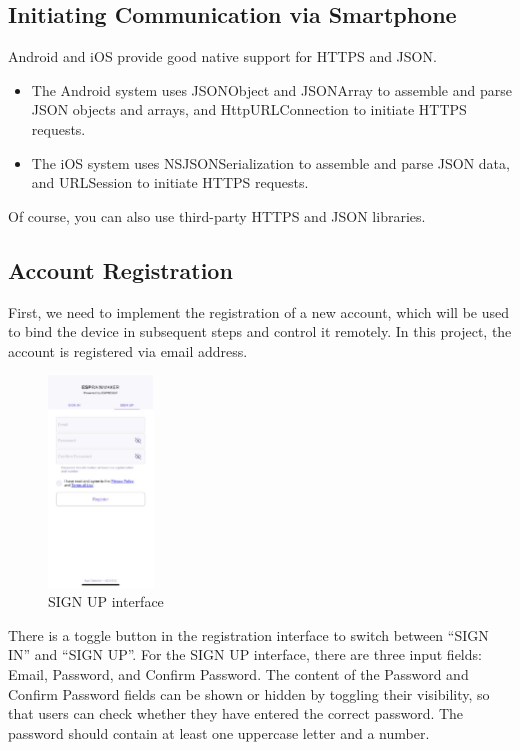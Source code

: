 \documentclass[a4paper,12pt,openany]{book}
\begin{document}
\subsection{Initiating Communication via Smartphone}
Android and iOS provide good native support for HTTPS and JSON.

\begin{itemize}
    \item The Android system uses JSONObject and JSONArray to assemble and parse JSON objects and arrays, and HttpURLConnection to initiate HTTPS requests.
    \item The iOS system uses NSJSONSerialization to assemble and parse JSON data, and URLSession to initiate HTTPS requests.
\end{itemize}

Of course, you can also use third-party HTTPS and JSON libraries.

\subsection{Account Registration}
First, we need to implement the registration of a new account, which will be used to bind the device in subsequent steps and control it remotely. In this project, the account is registered via email address.

\begin{figure}[ht]
    \centering
    \includegraphics[width=0.25\textwidth,frame]{D10Z/10-18}
    \caption{SIGN UP interface}
\end{figure}

There is a toggle button in the registration interface to switch between “SIGN IN” and “SIGN UP”. For the SIGN UP interface, there are three input fields: Email, Password, and Confirm Password. The content of the Password and Confirm Password fields can be shown or hidden by toggling their visibility, so that users can check whether they have entered the correct password. The password should contain at least one uppercase letter and a number.
\end{document}
